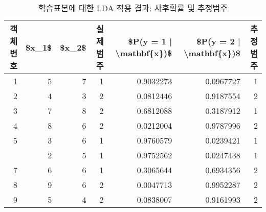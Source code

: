 \documentclass[
]{book}
\newenvironment{Shaded}{\begin{snugshade}}{\end{snugshade}}
\newcommand{\AttributeTok}[1]{\textcolor[rgb]{0.77,0.63,0.00}{#1}}
\newcommand{\ConstantTok}[1]{\textcolor[rgb]{0.00,0.00,0.00}{#1}}
\newcommand{\DecValTok}[1]{\textcolor[rgb]{0.00,0.00,0.81}{#1}}
\newcommand{\FunctionTok}[1]{\textcolor[rgb]{0.00,0.00,0.00}{#1}}
\newcommand{\NormalTok}[1]{#1}
\newcommand{\SpecialCharTok}[1]{\textcolor[rgb]{0.00,0.00,0.00}{#1}}
\newcommand{\StringTok}[1]{\textcolor[rgb]{0.31,0.60,0.02}{#1}}
\begin{document}
\begin{Shaded}
\end{Shaded}

\begin{table}

\caption{\label{tab:lda-posterior-result}학습표본에 대한 LDA 적용 결과: 사후확률 및 추정범주}
\centering
\begin{tabular}[t]{rrrrrrr}
\toprule
객체번호 & \$x\_1\$ & \$x\_2\$ & 실제범주 & \$P(y = 1 | \textbackslash{}mathbf\{x\})\$ & \$P(y = 2 | \textbackslash{}mathbf\{x\})\$ & 추정범주\\
\midrule
1 & 5 & 7 & 1 & 0.9032273 & 0.0967727 & 1\\
2 & 4 & 3 & 2 & 0.0812446 & 0.9187554 & 2\\
3 & 7 & 8 & 2 & 0.6812088 & 0.3187912 & 1\\
4 & 8 & 6 & 2 & 0.0212004 & 0.9787996 & 2\\
5 & 3 & 6 & 1 & 0.9760579 & 0.0239421 & 1\\
\addlinespace
6 & 2 & 5 & 1 & 0.9752562 & 0.0247438 & 1\\
7 & 6 & 6 & 1 & 0.3065644 & 0.6934356 & 2\\
8 & 9 & 6 & 2 & 0.0047713 & 0.9952287 & 2\\
9 & 5 & 4 & 2 & 0.0838007 & 0.9161993 & 2\\
\bottomrule
\end{tabular}
\end{table}
\end{document}
